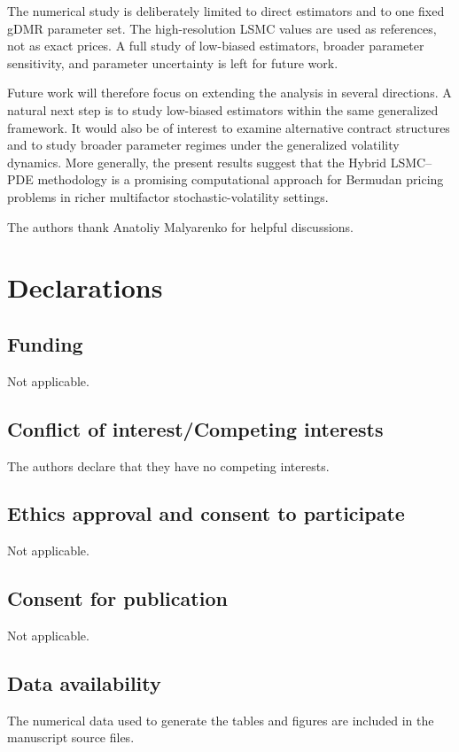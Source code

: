 \documentclass[pdflatex,sn-mathphys-num]{sn-jnl}
\theoremstyle{thmstyleone}%
\theoremstyle{thmstylethree}%
\theoremstyle{thmstyletwo}%
\begin{document}
The numerical study is deliberately limited to direct estimators and to one fixed
gDMR parameter set. The high-resolution LSMC values are used as references, not
as exact prices. A full study of low-biased estimators, broader parameter
sensitivity, and parameter uncertainty is left for future work.

Future work will therefore focus on extending the analysis in several directions. A natural next step is to study low-biased estimators within the same generalized framework. It would also be of interest to examine alternative contract structures and to study broader parameter regimes under the generalized volatility dynamics. More generally, the present results suggest that the Hybrid LSMC--PDE methodology is a promising computational approach for Bermudan pricing problems in richer multifactor stochastic-volatility settings.



\backmatter

The authors thank Anatoliy Malyarenko for helpful discussions.

\section*{Declarations}

\subsection*{Funding}
Not applicable.

\subsection*{Conflict of interest/Competing interests}
The authors declare that they have no competing interests.

\subsection*{Ethics approval and consent to participate}
Not applicable.

\subsection*{Consent for publication}
Not applicable.

\subsection*{Data availability}
The numerical data used to generate the tables and figures are included in the manuscript source files.
\end{document}
